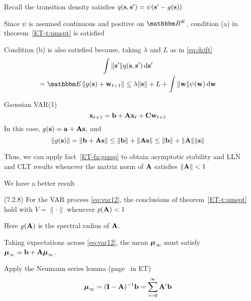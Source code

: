 \begin{frame}
    
    \vspace{2em}
    \Prf  Recall the transition density
    satisfies $q({\mathbf s}, {\mathbf s}' ) = \psi({\mathbf s}' - g({\mathbf s}))$ 
    
    Since
    $\psi$ is assumed continuous and positive on $\RR^K$, condition (a) in
    theorem~\ref{ET-t:umspt} is satisfied
    
    Condition (b) is also satisfied because,
    taking $\lambda$ and $L$ as in \eqref{eq:drift}
    \begin{multline*}
        \int \|\bolds'\| q(\bolds, \bolds' ) \diff  \bolds'
        \\ = \EE \|g(\bolds) + \boldw_{t+1} \| 
        \leq \lambda \| \bolds \| + L + \int \|\boldw\| \psi(\boldw) \diff \boldw
    \end{multline*}
\end{frame}

\begin{frame}

    \vspace{2em}
    \Eg Gaussian VAR(1)
    \begin{equation}
        \label{eq:var12}
        {\mathbf x}_{t+1} = {\mathbf b} + \mathbf A {\mathbf x}_t + \mathbf C {\mathbf w}_{t+1}
    \end{equation}
    In this case, $g({\mathbf s}) = {\mathbf a} + \mathbf A {\mathbf s}$, and
    \begin{equation*}
        \|g({\mathbf s})\| 
        = \| {\mathbf b} + \mathbf A {\mathbf s}\|
        \leq \| {\mathbf b} \|  + \| \mathbf A {\mathbf s}\|
        \leq \| {\mathbf b} \|  + \| \mathbf A \| \| {\mathbf s}\|
    \end{equation*}
    
    \vspace{.7em}
    Thus, we can apply fact~\ref{ET-fa:gsmp} to obtain asymptotic stability 
    and LLN and CLT results
    whenever the matrix norm of $\mathbf A$ satisfies $\|\mathbf A \| < 1$
    
\end{frame}

\begin{frame}

    \vspace{2em}
    We have a better result 
    
    \Fact (7.2.8)
    For the VAR process \eqref{eq:var12}, the conclusions of
    theorem~\ref{ET-t:umspt} hold with $V = \| \cdot \|$ whenever $\varrho(\mathbf A) <
    1$
    
    
    Here $\varrho(\mathbf A)$ is the spectral radius of $\mathbf A$.  
    
    Taking expectations across \eqref{eq:var12}, the mean
    ${\boldsymbol \mu}_{\infty}$ must satisfy ${\boldsymbol \mu}_{\infty} = {\mathbf b} + \mathbf A
    {\boldsymbol \mu}_{\infty}$.  
    
    Apply the Neumann series lemma (page~\pageref{ET-t:nms} in ET)
    \begin{equation*}
        {\boldsymbol \mu}_\infty 
        = (\mathbf I - \mathbf A)^{-1} {\mathbf b} 
        = \sum_{i=0}^{\infty} \mathbf A^i  {\mathbf b} 
    \end{equation*}
    
\end{frame}
    
